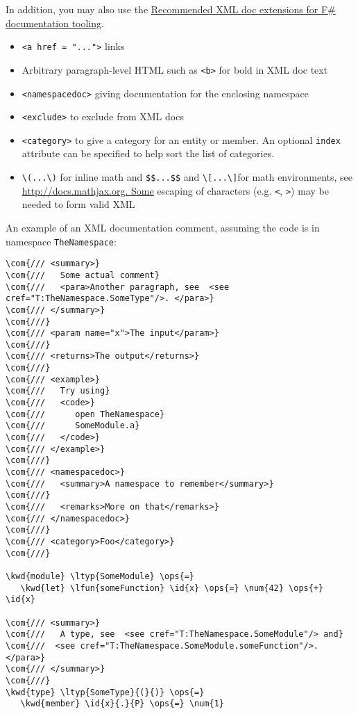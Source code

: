\documentclass{article}
\newcommand{\id}[1]{\textcolor{black}{#1}}
\newcommand{\com}[1]{\textcolor{officegreen}{#1}}
\newcommand{\kwd}[1]{\textcolor{navy}{#1}}
\newcommand{\num}[1]{\textcolor{officegreen}{#1}}
\newcommand{\ops}[1]{\textcolor{purple}{#1}}
\begin{document}
In addition, you may also use the \href{https://github.com/fsharp/fslang-design/blob/master/tooling/FST-1031-xmldoc-extensions.md}{Recommended XML doc extensions for F\# documentation tooling}.
\begin{itemize}
\item 

\texttt{<a href = "...">} links

\item 

Arbitrary paragraph-level HTML such as \texttt{<b>} for bold in XML doc text

\item 

\texttt{<namespacedoc>} giving documentation for the enclosing namespace

\item 

\texttt{<exclude>} to exclude from XML docs

\item 

\texttt{<category>} to give a category for an entity or member. An optional \texttt{index} attribute can be specified
to help sort the list of categories.

\item 

\texttt{{\textbackslash}(...{\textbackslash})} for inline math and \texttt{\$\$...\$\$} and \texttt{{\textbackslash}[...{\textbackslash}]}for math environments, see \href{http://docs.mathjax.org.
Some}{http://docs.mathjax.org.
Some} escaping of characters (e.g. \texttt{<}, \texttt{>}) may be needed to form valid XML

\end{itemize}



An example of an XML documentation comment, assuming the code is in namespace \texttt{TheNamespace}:
\begin{Verbatim}[commandchars=\\\{\}]
\com{/// <summary>}
\com{///   Some actual comment}
\com{///   <para>Another paragraph, see  <see cref="T:TheNamespace.SomeType"/>. </para>}
\com{/// </summary>}
\com{///}
\com{/// <param name="x">The input</param>}
\com{///}
\com{/// <returns>The output</returns>}
\com{///}
\com{/// <example>}
\com{///   Try using}
\com{///   <code>}
\com{///      open TheNamespace}
\com{///      SomeModule.a}
\com{///   </code>}
\com{/// </example>}
\com{///}
\com{/// <namespacedoc>}
\com{///   <summary>A namespace to remember</summary>}
\com{///}
\com{///   <remarks>More on that</remarks>}
\com{/// </namespacedoc>}
\com{///}
\com{/// <category>Foo</category>}
\com{///}

\kwd{module} \ltyp{SomeModule} \ops{=} 
   \kwd{let} \lfun{someFunction} \id{x} \ops{=} \num{42} \ops{+} \id{x}

\com{/// <summary>}
\com{///   A type, see  <see cref="T:TheNamespace.SomeModule"/> and}
\com{///  <see cref="T:TheNamespace.SomeModule.someFunction"/>. </para>}
\com{/// </summary>}
\com{///}
\kwd{type} \ltyp{SomeType}{(}{)} \ops{=}
   \kwd{member} \id{x}{.}{P} \ops{=} \num{1}
\end{Verbatim}
\end{document}
